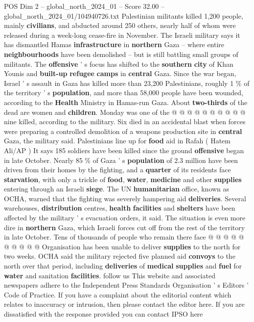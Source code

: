 \begin{textsample}{POS Dim 2 – global\_north\_2024\_01 – Score 32.00 – global\_north\_2024\_01/104940726.txt}
Palestinian militants killed 1,200 people, mainly \textbf{civilians}, and abducted around 250 others, nearly half of whom were released during a week-long cease-fire in November.
The Israeli military says it has dismantled Hamas \textbf{infrastructure} in \textbf{northern} Gaza -- where entire \textbf{neighbourhoods} have been demolished -- but is still battling small groups of militants.
The \textbf{offensive} ' s focus has shifted to the \textbf{southern} \textbf{city} of Khan Younis and \textbf{built-up} \textbf{refugee} \textbf{camps} in \textbf{central} Gaza.
Since the war began, Israel ' s assault in Gaza has killed more than 23,200 Palestinians, roughly 1 \% of the territory ' s \textbf{population}, and more than 58,000 people have been wounded, according to the \textbf{Health} Ministry in Hamas-run Gaza.
About \textbf{two-thirds} of the dead are women and \textbf{children}.
Monday was one of the @ @ @ @ @ @ @ @ @ @ nine killed, according to the military.
Six died in an accidental blast when forces were preparing a controlled demolition of a weapons production site in \textbf{central} Gaza, the military said.
Palestinians line up for \textbf{food} aid in Rafah ( Hatem Ali/AP ) It says 185 soldiers have been killed since the ground \textbf{offensive} began in late October.
Nearly 85 \% of Gaza ' s \textbf{population} of 2.3 million have been driven from their homes by the fighting, and a \textbf{quarter} of its residents face \textbf{starvation}, with only a trickle of \textbf{food}, \textbf{water}, \textbf{medicine} and other \textbf{supplies} entering through an Israeli \textbf{siege}.
The UN \textbf{humanitarian} office, known as OCHA, warned that the fighting was severely hampering aid \textbf{deliveries}.
Several warehouses, \textbf{distribution} centres, \textbf{health} \textbf{facilities} and \textbf{shelters} have been affected by the military ' s evacuation orders, it said.
The situation is even more dire in \textbf{northern} Gaza, which Israeli forces cut off from the rest of the territory in late October.
Tens of thousands of people who remain there face @ @ @ @ @ @ @ @ @ @ Organisation has been unable to deliver \textbf{supplies} to the north for two weeks.
OCHA said the military rejected five planned aid \textbf{convoys} to the north over that period, including \textbf{deliveries} of \textbf{medical} \textbf{supplies} and \textbf{fuel} for \textbf{water} and sanitation \textbf{facilities}. follow us This website and associated newspapers adhere to the Independent Press Standards Organisation ' s Editors ' Code of Practice.
If you have a complaint about the editorial content which relates to inaccuracy or intrusion, then please contact the editor here.
If you are dissatisfied with the response provided you can contact IPSO here

\end{textsample}
